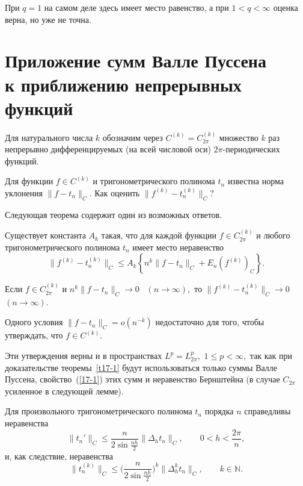  При $q=1$ на самом деле здесь имеет место равенство, а при $1<q<\infty$
 оценка верна, но уже не точна.


 \section{Приложение сумм Валле Пуссена \\ к приближению непрерывных
 функций}

 Для натурального числа $k$ обозначим через   ${C}^{(k)}={C}^{(k)}_{2\pi}$
 множество $k$ раз непрерывно дифференцируемых (на всей числовой оси)
 $2\pi$-периодических функций.



 \task %
 Для функции $f\in {C}^{(k)} $ и тригонометрического полинома $t_n$
 известна норма  уклонения $\|f-t_n\|_C.$
 Как оценить $\|f^{(k)}-t_n^{(k)}\|_C?$


Следующая теорема содержит один из возможных ответов.

 \begin{teo}\label{t17-1}
 Существует константа $A_k$ такая, что для каждой функции $f\in {C}^{(k)}_{2\pi} $ и любого
 тригонометрического полинома $t_n$ имеет место неравенство
 $$
 \|f^{(k)}-t_n^{(k)}\|_C\le A_k \left\{ n^k \|f-t_n\|_C+E_n
 (f^{(k)})_C\right\}.
 $$
 \end{teo}

 \begin{Corollary} %
 Если $f\in C^{(k)}_{2\pi}$ и $n^k \|f-t_n\|_C\to 0$~ $(n\to \infty),$ то
 $\|f^{(k)}-t_n^{(k)}\|_C\to 0$ $(n\to \infty).$
 \end{Corollary}

  \begin{Remark} %
 Одного условия $\|f-t_n\|_C=o(n^{-k})$
 недостаточно для того, чтобы утверждать, что $f\in {C}^{(k)}.$
 \end{Remark}

 \begin{Remark} %
 Эти утверждения верны и в пространствах $L^p=L^p_{2\pi},$ $1\le p<\infty,$
 так как при доказательстве теоремы~\ref{t17-1} будут использоваться только
 суммы Валле Пуссена, свойство~(\ref{17-1}) этих сумм и
 неравенство Бернштейна (в случае $C_{2\pi}$ усиленное в следующей
 лемме).
 \end{Remark}



 \begin{lemma}\label{l17-1}
 Для произвольного  тригонометрического полинома $t_n$ порядка $n$ справедливы
 неравенства
 $$
 \|t_n'\|_C\le \frac{n}{2\sin \frac{nh}{2}} \|\Delta_h t_n\|_C,\qquad
 0<h<\frac{2\pi}{n},
 $$
 и, как следствие, неравенства
 $$
 \|t_n^{(k)}\|_C\le \Big(\frac{n}{2\sin \frac{nh}{2}}\Big)^{k} \|\Delta_h^k t_n\|_C,\qquad
 k\in \mathbb N.
 $$
\end{lemma}

